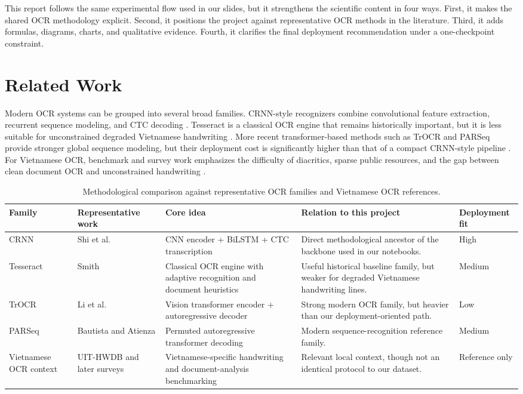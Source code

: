 \documentclass[12pt,a4paper]{article}
\begin{document}
This report follows the same experimental flow used in our slides, but it strengthens the scientific content in four ways. First, it makes the shared OCR methodology explicit. Second, it positions the project against representative OCR methods in the literature. Third, it adds formulas, diagrams, charts, and qualitative evidence. Fourth, it clarifies the final deployment recommendation under a one-checkpoint constraint.

\section{Related Work}
Modern OCR systems can be grouped into several broad families. CRNN-style recognizers combine convolutional feature extraction, recurrent sequence modeling, and CTC decoding \cite{crnn}. Tesseract is a classical OCR engine that remains historically important, but it is less suitable for unconstrained degraded Vietnamese handwriting \cite{tesseract}. More recent transformer-based methods such as TrOCR and PARSeq provide stronger global sequence modeling, but their deployment cost is significantly higher than that of a compact CRNN-style pipeline \cite{trocr,parseq}. For Vietnamese OCR, benchmark and survey work emphasizes the difficulty of diacritics, sparse public resources, and the gap between clean document OCR and unconstrained handwriting \cite{uit-hwdb,vietnamese-survey}.

\begin{table}[H]
\centering
\footnotesize
\begin{tabularx}{\textwidth}{@{}L{1.9cm}L{2.6cm}Y Y L{1.8cm}@{}}
\toprule
\textbf{Family} & \textbf{Representative work} & \textbf{Core idea} & \textbf{Relation to this project} & \textbf{Deployment fit} \\
\midrule
CRNN & Shi et al. \cite{crnn} & CNN encoder + BiLSTM + CTC transcription & Direct methodological ancestor of the backbone used in our notebooks. & High \\
Tesseract & Smith \cite{tesseract} & Classical OCR engine with adaptive recognition and document heuristics & Useful historical baseline family, but weaker for degraded Vietnamese handwriting lines. & Medium \\
TrOCR & Li et al. \cite{trocr} & Vision transformer encoder + autoregressive decoder & Strong modern OCR family, but heavier than our deployment-oriented path. & Low \\
PARSeq & Bautista and Atienza \cite{parseq} & Permuted autoregressive transformer decoding & Modern sequence-recognition reference family. & Medium \\
Vietnamese OCR context & UIT-HWDB and later surveys \cite{uit-hwdb,vietnamese-survey} & Vietnamese-specific handwriting and document-analysis benchmarking & Relevant local context, though not an identical protocol to our dataset. & Reference only \\
\bottomrule
\end{tabularx}
\caption{Methodological comparison against representative OCR families and Vietnamese OCR references.}
\label{tab:related-work}
\end{table}
\end{document}

